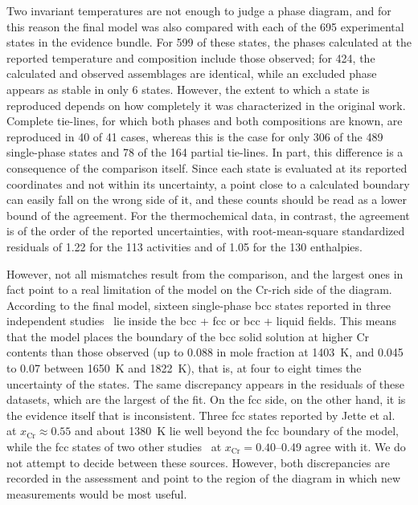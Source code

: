 Two invariant temperatures are not enough to judge a phase diagram, and for this reason the final model was also compared with each of the 695 experimental states in the evidence bundle. For 599 of these states, the phases calculated at the reported temperature and composition include those observed; for 424, the calculated and observed assemblages are identical, while an excluded phase appears as stable in only 6 states. However, the extent to which a state is reproduced depends on how completely it was characterized in the original work. Complete tie-lines, for which both phases and both compositions are known, are reproduced in 40 of 41 cases, whereas this is the case for only 306 of the 489 single-phase states and 78 of the 164 partial tie-lines. In part, this difference is a consequence of the comparison itself. Since each state is evaluated at its reported coordinates and not within its uncertainty, a point close to a calculated boundary can easily fall on the wrong side of it, and these counts should be read as a lower bound of the agreement. For the thermochemical data, in contrast, the agreement is of the order of the reported uncertainties, with root-mean-square standardized residuals of 1.22 for the 113 activities and of 1.05 for the 130 enthalpies.

However, not all mismatches result from the comparison, and the largest ones in fact point to a real limitation of the model on the Cr-rich side of the diagram. According to the final model, sixteen single-phase bcc states reported in three independent studies~\cite{svechnikov1962characteristics,dench1963adiabatic,collins1988electron} lie inside the bcc + fcc or bcc + liquid fields. This means that the model places the boundary of the bcc solid solution at higher Cr contents than those observed (up to 0.088 in mole fraction at \qty{1403}{\K}, and 0.045 to 0.07 between \qty{1650}{\K} and \qty{1822}{\K}), that is, at four to eight times the uncertainty of the states. The same discrepancy appears in the residuals of these datasets, which are the largest of the fit. On the fcc side, on the other hand, it is the evidence itself that is inconsistent. Three fcc states reported by Jette et al.~\cite{jette1934xray} at $x_{\mathrm{Cr}} \approx 0.55$ and about \qty{1380}{\K} lie well beyond the fcc boundary of the model, while the fcc states of two other studies~\cite{collins1988electron,hao2021}
 at $x_{\mathrm{Cr}} = 0.40$--0.49 agree with it. We do not attempt to decide between these sources. However, both discrepancies are recorded in the assessment and point to the region of the diagram in which new measurements would be most useful.

